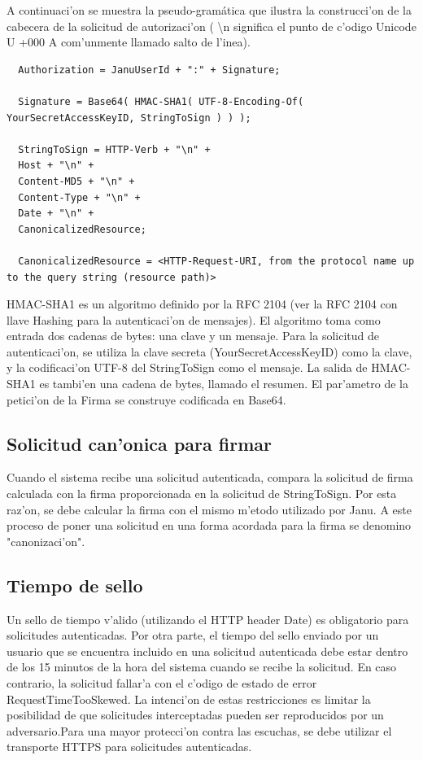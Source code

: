 A continuaci'on se muestra la pseudo-gramática que ilustra la construcci'on de la cabecera de la solicitud de autorizaci'on (
\textbackslash{}n significa el punto de c'odigo Unicode U +000 A com'unmente llamado salto de l'inea).

\medskip
\begin{lstlisting}
  Authorization = JanuUserId + ":" + Signature;

  Signature = Base64( HMAC-SHA1( UTF-8-Encoding-Of( YourSecretAccessKeyID, StringToSign ) ) );

  StringToSign = HTTP-Verb + "\n" +
  Host + "\n" +
  Content-MD5 + "\n" +
  Content-Type + "\n" +
  Date + "\n" +
  CanonicalizedResource;

  CanonicalizedResource = <HTTP-Request-URI, from the protocol name up to the query string (resource path)>
\end{lstlisting}

HMAC-SHA1 es un algoritmo definido por la RFC 2104 (ver la RFC 2104 con llave Hashing para la autenticaci'on de mensajes).
El algoritmo toma como entrada dos cadenas de bytes: una clave y un mensaje. Para la solicitud de autenticaci'on, se utiliza la clave secreta (YourSecretAccessKeyID) como la clave, y la codificaci'on UTF-8 del StringToSign como el mensaje. La salida de HMAC-SHA1 es tambi'en una cadena de bytes, llamado el resumen. El par'ametro de la petici'on de la Firma se construye codificada en Base64.

\subsection{Solicitud can'onica para firmar}

Cuando el sistema recibe una solicitud autenticada, compara la solicitud de firma calculada con la firma proporcionada en la solicitud de StringToSign. Por esta raz'on, se debe calcular la firma con el mismo m'etodo utilizado por Janu. A este proceso de poner una solicitud en una forma acordada para la firma se denomino "canonizaci'on".

\subsection{Tiempo de sello}

Un sello de tiempo v'alido (utilizando el HTTP header Date) es obligatorio para solicitudes autenticadas. Por otra parte, el tiempo del sello enviado por un usuario que se encuentra incluido en una solicitud autenticada debe estar dentro de los 15 minutos de la hora del sistema cuando se recibe la solicitud. En caso contrario, la solicitud fallar'a con el c'odigo de estado de error RequestTimeTooSkewed. La intenci'on de estas restricciones es limitar la posibilidad de que solicitudes interceptadas pueden ser reproducidos por un adversario.Para una mayor protecci'on contra las escuchas, se debe utilizar el transporte HTTPS para solicitudes autenticadas.

